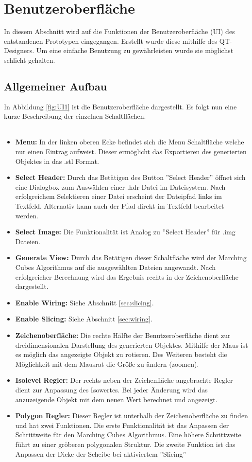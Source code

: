 \section{Benutzeroberfläche}
In diesem Abschnitt wird auf die Funktionen der Benutzeroberfläche (UI) des entstandenen Prototypen eingegangen. Erstellt wurde diese mithilfe des QT-Designers. Um eine einfache Benutzung zu gewährleisten wurde sie möglichst schlicht gehalten.

\subsection{Allgemeiner Aufbau}
In Abbildung \ref{fig:UI1} ist die Benutzeroberfläche dargestellt. Es folgt nun eine kurze Beschreibung der einzelnen Schaltflächen.\\
\\
\begin{itemize}
	\item \textbf{Menu:} In der linken oberen Ecke befindet sich die Menu Schaltfläche welche nur einen Eintrag aufweist. Dieser ermöglicht das Exportieren des generierten Objektes in das .stl Format.
	\item \textbf{Select Header:} Durch das Betätigen des Button ''Select Header'' öffnet sich eine Dialogbox zum Auswählen einer .hdr Datei im Dateisystem. Nach erfolgreichem Selektieren einer Datei erscheint der Dateipfad links im Textfeld. Alternativ kann auch der Pfad direkt im Textfeld bearbeitet werden.
	\item \textbf{Select Image:} Die Funktionalität ist Analog zu ''Select Header'' für .img Dateien.
	\item \textbf{Generate View:} Durch das Betätigen dieser Schaltfläche wird der Marching Cubes Algorithmus auf die ausgewählten Dateien angewandt. Nach erfolgreicher Berechnung wird das Ergebnis rechts in der Zeichenoberfläche dargestellt.
	\item \textbf{Enable Wiring:} Siehe Abschnitt \ref{sec:slicing}.
	\item \textbf{Enable Slicing:} Siehe Abschnitt \ref{sec:wiring}.
	\item \textbf{Zeichenoberfläche:} Die rechte Hälfte der Benutzeroberfläche dient zur dreidimensionalen Darstellung des generierten Objektes. Mithilfe der Maus ist es möglich das angezeigte Objekt zu rotieren. Des Weiteren besteht die Möglichkeit mit dem Mausrat die Größe zu ändern (zoomen).
	\item \textbf{Isolevel Regler:} Der rechts neben der Zeichenfläche angebrachte Regler dient zur Anpassung des Isowertes. Bei jeder Änderung wird das anzuzeigende Objekt mit dem neuen Wert berechnet und angezeigt.
	\item \textbf{Polygon Regler:} Dieser Regler ist unterhalb der Zeichenoberfläche zu finden und hat zwei Funktionen. Die erste Funktionalität ist das Anpassen der Schrittweite für den Marching Cubes Algorithmus. Eine höhere Schrittweite führt zu einer gröberen polygonalen Struktur. Die zweite Funktion ist das Anpassen der Dicke der Scheibe bei aktiviertem ''Slicing''
\end{itemize}
